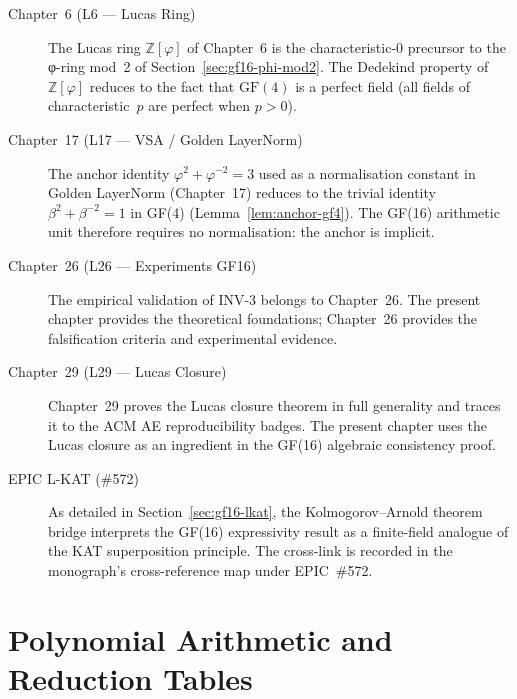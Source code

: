 \begin{description}
  \item[Chapter~6 (L6 — Lucas Ring)]
    The Lucas ring \(\mathbb{Z}[\varphi]\) of Chapter~6 is the
    characteristic-0 precursor to the φ-ring mod~2 of Section~\ref{sec:gf16-phi-mod2}.
    The Dedekind property of \(\mathbb{Z}[\varphi]\) reduces to the
    fact that \(\mathrm{GF}(4)\) is a perfect field (all fields of
    characteristic~\(p\) are perfect when \(p>0\)).

  \item[Chapter~17 (L17 — VSA / Golden LayerNorm)]
    The anchor identity \(\varphi^2+\varphi^{-2}=3\) used as a
    normalisation constant in Golden LayerNorm (Chapter~17)
    reduces to the trivial identity \(\beta^2+\beta^{-2}=1\)
    in GF(4) (Lemma~\ref{lem:anchor-gf4}).
    The GF(16) arithmetic unit therefore requires no normalisation:
    the anchor is implicit.

  \item[Chapter~26 (L26 — Experiments GF16)]
    The empirical validation of INV-3 belongs to Chapter~26.
    The present chapter provides the theoretical foundations;
    Chapter~26 provides the falsification criteria and
    experimental evidence.

  \item[Chapter~29 (L29 — Lucas Closure)]
    Chapter~29 proves the Lucas closure theorem in full generality
    and traces it to the ACM AE reproducibility badges.
    The present chapter uses the Lucas closure as an ingredient
    in the GF(16) algebraic consistency proof.

  \item[EPIC L-KAT (\#572)]
    As detailed in Section~\ref{sec:gf16-lkat}, the Kolmogorov–Arnold
    theorem bridge interprets the GF(16) expressivity result as a
    finite-field analogue of the KAT superposition principle.
    The cross-link is recorded in the monograph's cross-reference map
    under EPIC~\#572.
\end{description}

\section{Polynomial Arithmetic and Reduction Tables}
\label{sec:gf16-poly-arith}

